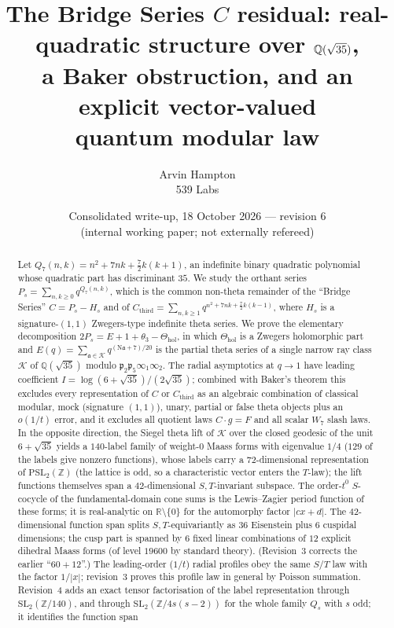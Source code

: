 \documentclass[11pt]{article}
\title{The Bridge Series $C$ residual: real-quadratic structure over $\Q(\sqrt{35})$,\\
a Baker obstruction, and an explicit vector-valued\\ quantum modular law}
\author{Arvin Hampton\\ \small 539 Labs}
\date{Consolidated write-up, 18 October 2026 --- revision 6\\ \small (internal working paper; not externally refereed)}
\theoremstyle{definition}
\newcommand{\Q}{\mathbb{Q}}
\newcommand{\Z}{\mathbb{Z}}
\newcommand{\R}{\mathbb{R}}
\newcommand{\K}{\mathcal{K}}
\newcommand{\fp}{\mathfrak{p}}
\newcommand{\fa}{\mathfrak{a}}
\newcommand{\Thol}{\Theta_{\mathrm{hol}}}
\newcommand{\Cthird}{C_{\mathrm{third}}}
\newcommand{\Nm}{\mathrm{N}}
\begin{document}
\maketitle

\begin{abstract}
Let $Q_7(n,k)=n^2+7nk+\tfrac72 k(k+1)$, an indefinite binary quadratic polynomial whose
quadratic part has discriminant $35$. We study the orthant series
$P_s=\sum_{n,k\ge 0}q^{Q_7(n,k)}$, which is the common non-theta remainder of the
``Bridge Series'' $C=P_s-H_s$ and of $\Cthird=\sum_{n,k\ge1}q^{n^2+7nk+\frac72k(k-1)}$,
where $H_s$ is a signature-$(1,1)$ Zwegers-type indefinite theta series.
We prove the elementary decomposition $2P_s=E+1+\theta_3-\Thol$, in which
$\Thol$ is a Zwegers holomorphic part and $E(q)=\sum_{\fa\in\K}q^{(\Nm\fa+7)/20}$ is the
partial theta series of a single narrow ray class $\K$ of $\Q(\sqrt{35})$ modulo $\fp_2\fp_5\infty_1\infty_2$.
The radial asymptotics at $q\to1$ have leading coefficient
$I=\log(6+\sqrt{35})/(2\sqrt{35})$; combined with Baker's theorem this excludes every
representation of $C$ or $\Cthird$ as an algebraic combination of classical modular, mock
(signature $(1,1)$), unary, partial or false theta objects plus an $o(1/t)$ error, and it excludes
all quotient laws $C\cdot g=F$ and all scalar $W_7$ slash laws. In the opposite direction,
the Siegel theta lift of $\K$ over the closed geodesic of the unit $6+\sqrt{35}$ yields a
$140$-label family of weight-$0$ Maass forms with eigenvalue $1/4$ ($129$ of the labels give nonzero functions), whose labels carry a $72$-dimensional
representation of $\mathrm{PSL}_2(\Z)$ (the lattice is odd, so a characteristic vector enters the $T$-law); the lift functions themselves span a
$42$-dimensional $S,T$-invariant subspace.
The order-$t^0$ $S$-cocycle of the fundamental-domain cone sums is the Lewis--Zagier period
function of these forms; it is real-analytic on $\R\setminus\{0\}$ for the automorphy factor
$|cx+d|$. The $42$-dimensional function span splits $S,T$-equivariantly as $36$ Eisenstein plus $6$ cuspidal dimensions; the cusp part is
spanned by $6$ fixed linear combinations of $12$ explicit dihedral Maass forms (of level $19600$ by standard theory). (Revision~3 corrects the
earlier ``$60+12$''.) The leading-order ($1/t$) radial profiles obey the same $S/T$ law with the factor $1/|x|$; revision~3 proves this
profile law in general by Poisson summation. Revision~4 adds an exact tensor factorisation of the label representation through
$\mathrm{SL}_2(\Z/140)$, and through $\mathrm{SL}_2(\Z/4s(s-2))$ for the whole family $Q_s$ with $s$ odd; it identifies the function span

\end{abstract}
\end{document}

